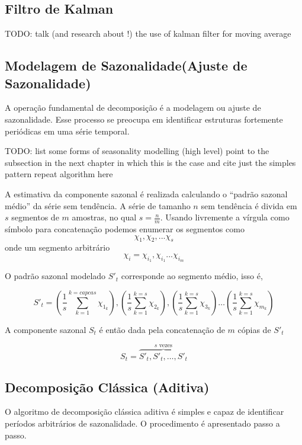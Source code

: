 \subsection{Filtro de Kalman}

TODO: talk (and research about !) the use of kalman filter for moving average

\subsection{Modelagem de Sazonalidade(Ajuste de Sazonalidade)}

A operação fundamental de decomposição é a modelagem ou ajuste de sazonalidade.
Esse processo se preocupa em identificar estruturas fortemente periódicas em
uma série temporal.

TODO: list some forms of seasonality modelling (high level) point to the
subsection in the next chapter in which this is the case and cite just the
simples pattern repeat algorithm here

A estimativa da componente sazonal é realizada calculando o ``padrão sazonal
médio'' da série sem tendência. A série de tamanho $n$ sem tendência é divida
em $s$ segmentos de $m$ amostras, no qual $s = \frac{n}{m}$. Usando livremente
a vírgula como símbolo para concatenação podemos enumerar os segmentos como
$$\chi_1, \chi_2, ... \chi_s$$ onde um segmento arbitrário $$\chi_i =
\chi_{i_{1}}, \chi_{i_{1}} ... \chi_{i_{m}}$$

O padrão sazonal modelado $S'_t$ corresponde ao segmento médio, isso é,

$$ S'_t = \left(\frac{1}{s} \sum_{k=1}^{k=capcas} \chi_{1_{k}}\right), \left(\frac{1}{s} \sum_{k=1}^{k=s} \chi_{2_{k}}\right), \left(\frac{1}{s} \sum_{k=1}^{k=s} \chi_{3_{k}}\right) \hdots \left(\frac{1}{s} \sum_{k=1}^{k=s} \chi_{m_{k}}\right)$$

A componente sazonal $S_t$ é então dada pela concatenação de $m$ cópias de
$S'_t$

$$ S_t = \overbrace{S'_t, S'_t, \hdots, S'_t}^{s\text{ vezes}} $$

\subsection{Decomposição Clássica (Aditiva)}\label{ssec:classical_decomposition}

O algoritmo de decomposição clássica aditiva é simples e capaz de identificar
períodos arbitrários de sazonalidade. O procedimento é apresentado passo a
passo.

